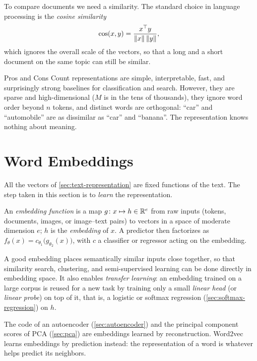 To compare documents we need a similarity. The standard choice in language processing is the \emph{cosine similarity}
\[
\cos(x,y)=\frac{x^{\top} y}{\lVert x\rVert\,\lVert y\rVert},
\]
which ignores the overall scale of the vectors, so that a long and a short document on the same topic can still be similar.

\begin{notebox}{Pros and Cons}
Count representations are simple, interpretable, fast, and surprisingly strong baselines for classification and search. However, they are sparse and high-dimensional ($M$ is in the tens of thousands), they ignore word order beyond $n$ tokens, and distinct words are orthogonal: ``car'' and ``automobile'' are as dissimilar as ``car'' and ``banana''. The representation knows nothing about meaning.
\end{notebox}

\section{Word Embeddings}\label{sec:embeddings}

All the vectors of \cref{sec:text-representation} are fixed functions of the text. The step taken in this section is to \emph{learn} the representation.

\begin{definition}[Embedding]
An \emph{embedding function} is a map $g\colon x\mapsto h\in\mathbb{R}^e$ from raw inputs (tokens, documents, images, or image--text pairs) to vectors in a space of moderate dimension $e$; $h$ is the \emph{embedding} of $x$. A predictor then factorizes as $f_\theta(x)=c_{\theta_1}\big(g_{\theta_2}(x)\big)$, with $c$ a classifier or regressor acting on the embedding.
\end{definition}

A good embedding places semantically similar inputs close together, so that similarity search, clustering, and semi-supervised learning can be done directly in embedding space. It also enables \emph{transfer learning}: an embedding trained on a large corpus is reused for a new task by training only a small \emph{linear head} (or \emph{linear probe}) on top of it, that is, a logistic or softmax regression (\cref{sec:softmax-regression}) on $h$.

\begin{remark}
The code of an autoencoder (\cref{sec:autoencoder}) and the principal component scores of PCA (\cref{sec:pca}) are embeddings learned by reconstruction. Word2vec learns embeddings by prediction instead: the representation of a word is whatever helps predict its neighbors.
\end{remark}

